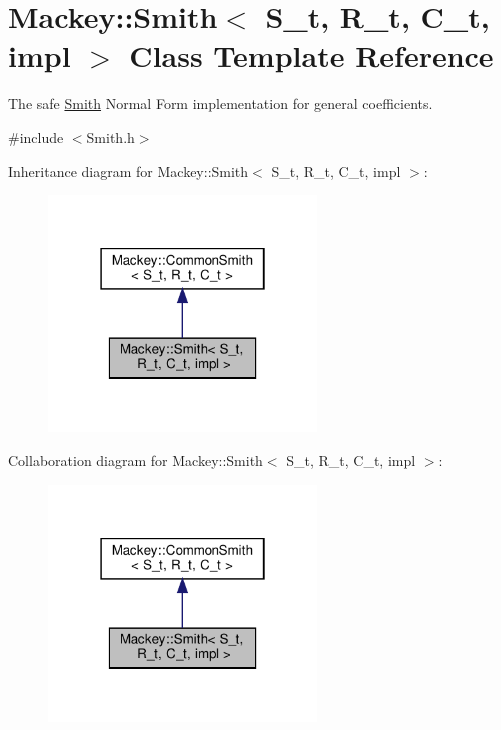 \hypertarget{classMackey_1_1Smith}{}\section{Mackey\+:\+:Smith$<$ S\+\_\+t, R\+\_\+t, C\+\_\+t, impl $>$ Class Template Reference}
\label{classMackey_1_1Smith}


The safe \hyperlink{classMackey_1_1Smith}{Smith} Normal Form implementation for general coefficients.  




{\ttfamily \#include $<$Smith.\+h$>$}



Inheritance diagram for Mackey\+:\+:Smith$<$ S\+\_\+t, R\+\_\+t, C\+\_\+t, impl $>$\+:\nopagebreak
\begin{figure}[H]
\begin{center}
\leavevmode
\includegraphics[width=202pt]{classMackey_1_1Smith__inherit__graph}
\end{center}
\end{figure}


Collaboration diagram for Mackey\+:\+:Smith$<$ S\+\_\+t, R\+\_\+t, C\+\_\+t, impl $>$\+:\nopagebreak
\begin{figure}[H]
\begin{center}
\leavevmode
\includegraphics[width=202pt]{classMackey_1_1Smith__coll__graph}
\end{center}
\end{figure}
